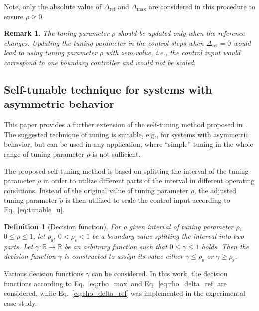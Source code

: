 \documentclass[preprint,12pt]{elsarticle}
\newtheorem{remark}[theorem]{Remark}
\newtheorem{definition}{Definition}[section]
\begin{document}
	Note, only the absolute value of $\Delta_{\mathrm{ref}}$ and $\Delta_{\max}$ are considered in this procedure to ensure $\rho \ge 0$. 
	
	\begin{remark}
		The tuning parameter $\rho$ should be updated only when the reference changes. Updating the tuning parameter in the control steps when $\Delta_{\mathrm{ref}} = 0$ would lead to using tuning parameter $\rho$ with zero value, i.e., the control input would correspond to one boundary controller and would not be scaled.
	\end{remark}
	
	
	\subsection{Self-tunable technique for systems with asymmetric behavior}
	\label{sec:self_tunable_rho_scaling}
	
	This paper provides a further extension of the self-tuning method proposed in~\cite{self_tunable}. The suggested technique of tuning is suitable, e.g., for systems with asymmetric behavior, but can be used in any application, where ``simple'' tuning in the whole range of tuning parameter $\rho$ is not sufficient.
	
	The proposed self-tuning method is based on splitting the interval of the tuning parameter $\rho$ in order to utilize different parts of the interval in different operating conditions. Instead of the original value of tuning parameter $\rho$, the adjusted tuning parameter $\widetilde{\rho}$ is then utilized to scale the control input according to Eq.~\eqref{eq:tunable_u}.
	
	\begin{definition}[Decision function]
		\label{def:gamma}
		For a given interval of tuning parameter $\rho$, $0 \leq \rho \leq 1$, let $\rho_{\mathrm{s}}$, $0 < \rho_{\mathrm{s}} < 1$ be a boundary value splitting the interval into two parts. Let $\gamma: \mathbb{R} \rightarrow \mathbb{R}$ be an arbitrary function such that $0 \leq \gamma \leq 1$ holds. Then the decision function $\gamma$ is constructed to assign its value either $\gamma \leq \rho_{\mathrm{s}}$ or $\gamma \ge \rho_{\mathrm{s}}$.
	\end{definition}
	Various decision functions $\gamma$ can be considered. In this work, the decision functions according to Eq.~\eqref{eq:rho_max} and Eq.~\eqref{eq:rho_delta_ref} are considered, while Eq.~\eqref{eq:rho_delta_ref} was implemented in the experimental case study.
	
\end{document}
